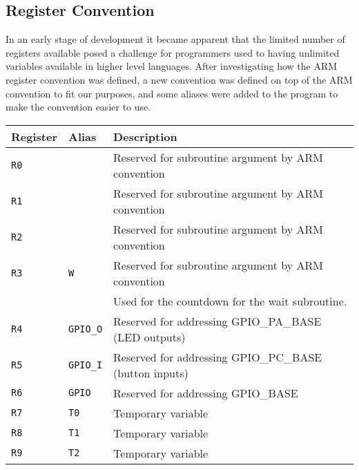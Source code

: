 \subsection{Register Convention}

In an early stage of development it became apparent that the limited number of registers available posed a challenge for programmers used to having unlimited variables available in higher level languages.
After investigating how the ARM register convention was defined, a new convention was defined on top of the ARM convention to fit our purposes, and some aliases were added to the program to make the convention easier to use.

\begin{table}[h!]
    \label{tbl:register-convention} 
    \begin{tabular}{l | l | l}
        Register        & Alias             & Description                                            \\
        \hline
        \texttt{R0}     & ~                 & Reserved for subroutine argument by ARM convention     \\
        \texttt{R1}     & ~                 & Reserved for subroutine argument by ARM convention     \\
        \texttt{R2}     & ~                 & Reserved for subroutine argument by ARM convention     \\
        \texttt{R3}     & \texttt{W}        & Reserved for subroutine argument by ARM convention     \\
        ~               & ~                 & Used for the countdown for the wait subroutine.        \\
        \texttt{R4}     & \texttt{GPIO\_O}  & Reserved for addressing GPIO\_PA\_BASE (LED outputs)   \\
        \texttt{R5}     & \texttt{GPIO\_I}  & Reserved for addressing GPIO\_PC\_BASE (button inputs) \\
        \texttt{R6}     & \texttt{GPIO}     & Reserved for addressing GPIO\_BASE                     \\
        \texttt{R7}     & \texttt{T0}       & Temporary variable                                     \\
        \texttt{R8}     & \texttt{T1}       & Temporary variable                                     \\
        \texttt{R9}     & \texttt{T2}       & Temporary variable                                     \\

\end{tabular}
\end{table}
